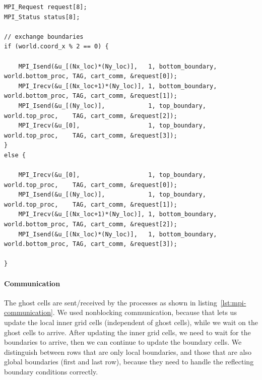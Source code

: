 \documentclass[a4paper]{article}
\begin{document}
\begin{lstlisting}[label={lst:mpi-communication}, caption={Communication of the ghost cells}, float]
MPI_Request request[8];
MPI_Status status[8];

// exchange boundaries
if (world.coord_x % 2 == 0) {
    
    MPI_Isend(&u_[(Nx_loc)*(Ny_loc)],   1, bottom_boundary, world.bottom_proc, TAG, cart_comm, &request[0]);
    MPI_Irecv(&u_[(Nx_loc+1)*(Ny_loc)], 1, bottom_boundary, world.bottom_proc, TAG, cart_comm, &request[1]);
    MPI_Isend(&u_[(Ny_loc)],            1, top_boundary,    world.top_proc,    TAG, cart_comm, &request[2]);
    MPI_Irecv(&u_[0],                   1, top_boundary,    world.top_proc,    TAG, cart_comm, &request[3]);
}
else {
    
    MPI_Irecv(&u_[0],                   1, top_boundary,    world.top_proc,    TAG, cart_comm, &request[0]);
    MPI_Isend(&u_[(Ny_loc)],            1, top_boundary,    world.top_proc,    TAG, cart_comm, &request[1]);
    MPI_Irecv(&u_[(Nx_loc+1)*(Ny_loc)], 1, bottom_boundary, world.bottom_proc, TAG, cart_comm, &request[2]);
    MPI_Isend(&u_[(Nx_loc)*(Ny_loc)],   1, bottom_boundary, world.bottom_proc, TAG, cart_comm, &request[3]);

}
\end{lstlisting}

\paragraph{Communication}\label{sec:communication}
The ghost cells are sent/received by the processes as shown in listing~\ref{lst:mpi-communication}.
We used nonblocking communication, because that lets us update the local inner grid cells (independent of ghost cells), while we wait on the ghost cells to arrive.
After updating the inner grid cells, we need to wait for the boundaries to arrive, then we can continue to update the boundary cells.
We distinguish between rows that are only local boundaries, and those that are also global boundaries (first and last row), because they need to handle the reflecting boundary conditions correctly.
\end{document}
